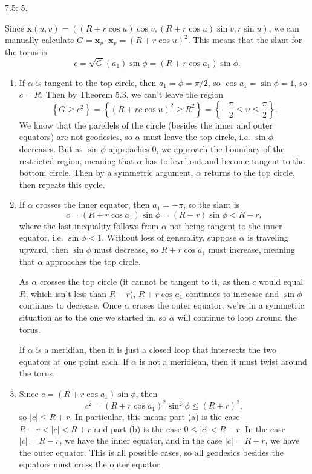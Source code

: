 \documentclass[10pt]{report}
\begin{document}
\pagebreak
\begin{exer}[]
7.5: 5.
\end{exer}
Since $\mathbf{x}(u,v) = ( (R+r\cos u) \cos v, (R + r\cos u) \sin v, r \sin u)$, we can manually calculate $G = \mathbf{x}_{v}\cdot \mathbf{x}_{v} = (R+r\cos u)^2$. This means that the slant for the torus is
\[
	c = \sqrt{G} (a_1) \sin \phi = (R+r\cos a_1) \sin \phi.
\]

\begin{enumerate}
	\item If $\alpha$ is tangent to the top circle, then $a_1=\phi=\pi/2$, so $\cos a_1=\sin\phi=1$, so $c = R$. Then by Theorem 5.3, we can't leave the region
\[
	\left\{ G \geq c^2 \right\} = \left\{ (R+r c\cos u)^2 \geq R^2 \right\} = \left\{ -\frac{\pi}{2} \leq u \leq \frac{\pi}{2}  \right\}.
\] We know that the parellels of the circle (besides the inner and outer equators) are not geodesics, so $\alpha$ must leave the top circle, i.e. $\sin \phi$ decreases. But as $\sin \phi$ approaches 0, we approach the boundary of the restricted region, meaning that $\alpha$ has to level out and become tangent to the bottom circle. Then by a symmetric argument, $\alpha$ returns to the top circle, then repeats this cycle.

	\item If $\alpha$ crosses the inner equator, then $a_1=-\pi$, so the slant is
		\[
			c = (R+r \cos a_1) \sin \phi = (R-r) \sin \phi < R-r,
		\] where the last inequality follows from $\alpha$ not being tangent to the inner equator, i.e. $\sin \phi<1$. Without loss of generality, suppose $\alpha$ is traveling upward, then $\sin \phi$ must decrease, so $R + r\cos a_1$ must increase, meaning that $\alpha$ approaches the top circle.

		As $\alpha$ crosses the top circle (it cannot be tangent to it, as then $c$ would equal $R$, which isn't less than $R-r$), $R+r \cos a_1$ continues to increase and $\sin \phi$ continues to decrease. Once $\alpha$ croses the outer equator, we're in a symmetric situation as to the one we started in, so $\alpha$ will continue to loop around the torus.

		If $\alpha$ is a meridian, then it is just a closed loop that intersects the two equators at one point each. If $\alpha$ is not a meridiean, then it must twist around the torus.

	\item Since $c = (R+r \cos a_1)\sin \phi$, then
		\[
			c^2 = (R+r\cos a_1)^2 \sin^2 \phi \leq (R+r)^2,
		\] so $|c| \leq R+r$. In particular, this means part (a) is the case $R-r < |c| < R+r$ and part (b) is the case $0 \leq |c| < R-r$. In the case $|c|=R-r$, we have the inner equator, and in the case $|c|=R+r$, we have the outer equator. This is all possible cases, so all geodesics besides the equators must cross the outer equator.
\end{enumerate}
\end{document}
